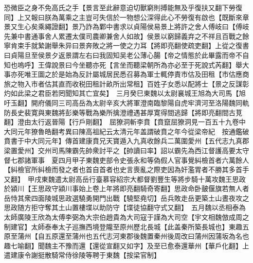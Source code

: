 恐微臣之身不免高氏之手【景言至此辭意迫切獸窮則搏能無及乎復扶又翻下勞復同】上又報曰朕為萬乘之主豈可失信於一物想公深得此心不勞復有啟也【既斷來章景又生心矣乘繩證翻】景乃詐為鄴中書求以貞陽侯易景上將許之舍人傅岐曰【傅岐先兼中書通事舍人累遷太僕司農卿兼舍人如故】侯景以窮歸義弃之不祥且百戰之餘寧肯束手就縶謝舉朱异曰景奔敗之將一使之力耳【將即亮翻使疏吏翻】上從之復書曰貞陽旦至侯景夕返景謂左右曰我固知吴老公薄心腸【帝之情態於此畢露而帝不自知也嗚呼】王偉說景曰今坐聽亦死【言坐而聽梁朝所為亦必至于死說式芮翻】舉大事亦死唯王圖之於是始為反計屬城居民悉召募為軍士輒停責市估及田租【市估應商旅之物入市者估其直而收税田租計畝所出常租】百姓子女悉以配將士【景之反謀彰灼如此梁之君臣若罔聞知其亡宜矣】　三月癸巳東魏以太尉襄城王旭為大司馬【旭吁玉翻】開府儀同三司高岳為太尉辛亥大將軍澄南臨黎陽自虎牢濟河至洛陽魏同軌防長史裴寛與東魏將彭樂等戰為樂所擒澄禮遇甚厚寛得間逃歸【將即亮翻間古莧翻】澄由太行返晉陽【行戶剛翻】　屈獠洞斬李賁【賁竄屈獠洞見一百五十九卷中大同元年獠魯皓翻考異曰陳高祖紀云太清元年盖謂破賁之年今從梁帝紀　按通鑑破賁書于中大同元年】傳首建康賁兄天寶遁入九真收餘兵二萬圍愛州【五代志九真郡梁置愛州】交州司馬陳霸先帥衆討平之【帥讀曰率】詔以霸先為西江督護高要太守督七郡諸軍事　夏四月甲子東魏吏部令史張永和等偽假人官事覺糾檢首者六萬餘人【糾檢官所糾檢而發之者也首自首者也史言喪亂之際吏因為奸濫胃者不勝其多首手又翻】　甲戌東魏遣太尉高岳行臺慕容紹宗大都督劉豐生等將步騎十萬攻魏王思政於潁川【王思政守潁川事始上卷上年將即亮翻騎奇寄翻】思政命卧皷偃旗若無人者岳恃其衆四面陵城思政選驍勇開門出戰【驍堅堯切】岳兵敗走岳更築土山晝夜攻之思政随方拒守奪其土山置樓堞以助防守【堞徒協翻守式又翻】　五月魏以丞相泰為太師廣陵王欣為太傅李弼為大宗伯趙貴為大司寇于謹為大司空【宇文相魏倣成周之制建官】太師泰奉太子巡撫西境登隴至原州歷北長城【此盖秦所築長城也】東趣五原至蒲州【自五原還至蒲州也五代志河東郡後魏置秦州後周改曰蒲州因蒲坂為名也趣七喻翻】聞魏主不豫而還【還從宣翻又如字】及至已愈泰還華州【華戶化翻】上遣建康令謝挺散騎常侍徐陵等聘于東魏【按梁官制】

